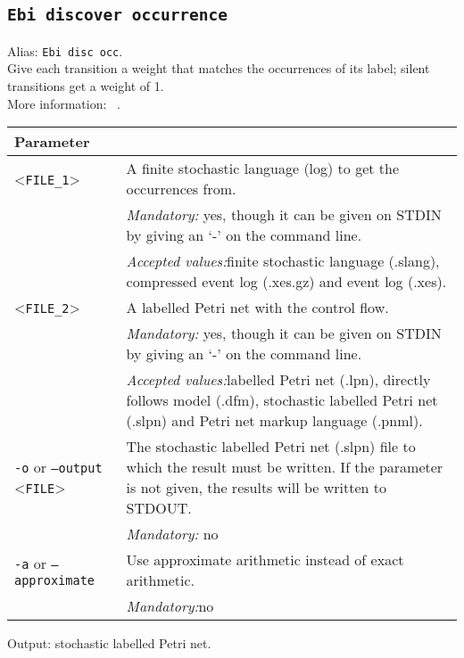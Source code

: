 {\subsection{\texttt{Ebi discover occurrence}}
\label{command:Ebi discover occurrence}
Alias: \texttt{Ebi disc occ}.\\
Give each transition a weight that matches the occurrences of its label; silent transitions get a weight of 1.\\
More information: ~\cite{DBLP:conf/icpm/BurkeLW20}.\\
\begin{tabularx}{\linewidth}{lX}
\toprule
Parameter \\\midrule
<\texttt{FILE\_1}>&A finite stochastic language (log) to get the occurrences from.\\
&\textit{Mandatory:} \quad yes, though it can be given on STDIN by giving an `-' on the command line.\\
&\textit{Accepted values:}\quad finite stochastic language (.slang), compressed event log (.xes.gz) and event log (.xes).\\
<\texttt{FILE\_2}>&A labelled Petri net with the control flow.\\
&\textit{Mandatory:} \quad yes, though it can be given on STDIN by giving an `-' on the command line.\\
&\textit{Accepted values:}\quad labelled Petri net (.lpn), directly follows model (.dfm), stochastic labelled Petri net (.slpn) and Petri net markup language (.pnml).\\
\texttt{-o} or \texttt{--output} <\texttt{FILE}> &
The stochastic labelled Petri net (.slpn) file to which the result must be written. If the parameter is not given, the results will be written to STDOUT.\\
&\textit{Mandatory:} \quad no\\
\texttt{-a} or \texttt{--approximate} & Use approximate arithmetic instead of exact arithmetic.\\
&\textit{Mandatory:}\quad no\\
\bottomrule
\end{tabularx}
Output: stochastic labelled Petri net.
}
